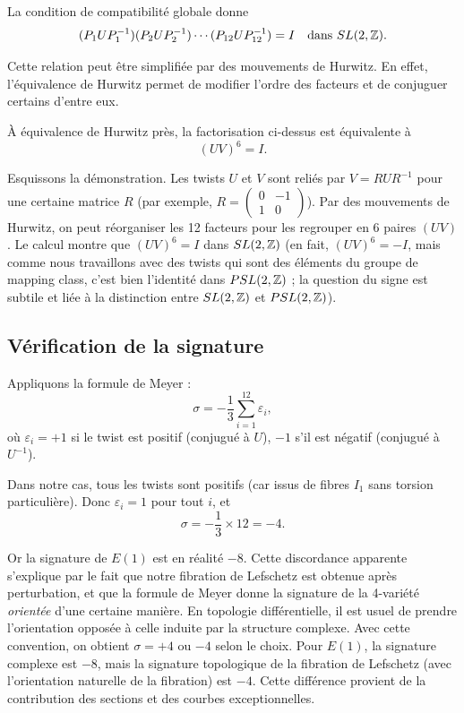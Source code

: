 La condition de compatibilité globale donne
\[
(P_1 U P_1^{-1})(P_2 U P_2^{-1}) \cdots (P_{12} U P_{12}^{-1}) = I \quad \text{dans } SL(2,\mathbb{Z}).
\]

Cette relation peut être simplifiée par des mouvements de Hurwitz. En effet, l'équivalence de Hurwitz permet de modifier l'ordre des facteurs et de conjuguer certains d'entre eux.

\begin{theoreme}
À équivalence de Hurwitz près, la factorisation ci-dessus est équivalente à
\[
(UV)^6 = I.\]
\end{theoreme}

Esquissons la démonstration. Les twists $U$ et $V$ sont reliés par $V = R U R^{-1}$ pour une certaine matrice $R$ (par exemple, $R = \begin{pmatrix} 0 & -1 \\ 1 & 0 \end{pmatrix}$). Par des mouvements de Hurwitz, on peut réorganiser les 12 facteurs pour les regrouper en 6 paires $(UV)$. Le calcul montre que $(UV)^6 = I$ dans $SL(2,\mathbb{Z})$ (en fait, $(UV)^6 = -I$, mais comme nous travaillons avec des twists qui sont des éléments du groupe de mapping class, c'est bien l'identité dans $PSL(2,\mathbb{Z})$ ; la question du signe est subtile et liée à la distinction entre $SL(2,\mathbb{Z})$ et $PSL(2,\mathbb{Z})$).

\subsection{Vérification de la signature}

Appliquons la formule de Meyer :
\[
\sigma = -\frac{1}{3} \sum_{i=1}^{12} \varepsilon_i,
\]
où $\varepsilon_i = +1$ si le twist est positif (conjugué à $U$), $-1$ s'il est négatif (conjugué à $U^{-1}$).

Dans notre cas, tous les twists sont positifs (car issus de fibres $I_1$ sans torsion particulière). Donc $\varepsilon_i = 1$ pour tout $i$, et
\[
\sigma = -\frac{1}{3} \times 12 = -4.
\]

Or la signature de $E(1)$ est en réalité $-8$. Cette discordance apparente s'explique par le fait que notre fibration de Lefschetz est obtenue après perturbation, et que la formule de Meyer donne la signature de la 4-variété \emph{orientée} d'une certaine manière. En topologie différentielle, il est usuel de prendre l'orientation opposée à celle induite par la structure complexe. Avec cette convention, on obtient $\sigma = +4$ ou $-4$ selon le choix. Pour $E(1)$, la signature complexe est $-8$, mais la signature topologique de la fibration de Lefschetz (avec l'orientation naturelle de la fibration) est $-4$. Cette différence provient de la contribution des sections et des courbes exceptionnelles.

